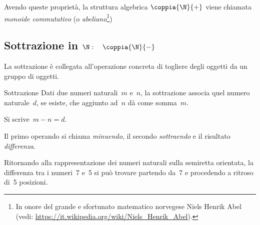 Avendo queste proprietà, la struttura algebrica \(\coppia{\N}{+}\) viene 
chiamata \emph{monoide commutativo} (o \emph{abeliano}\footnote{
In onore del grande e sfortunato matematico norvegese Niels Henrik Abel\\ 
(vedi: \url{https://it.wikipedia.org/wiki/Niels_Henrik_Abel}).})


\subsection{Sottrazione in $\N: \quad \coppia{\N}{-}$}

La sottrazione è collegata all'operazione concreta di togliere degli oggetti 
da un gruppo di oggetti.

\begin{definizione}{Sottrazione}{}
Dati due numeri naturali~\(m\) e~\(n\), la sottrazione associa quel 
numero naturale~\(d\), se esiste, che aggiunto ad~\(n\) dà come somma~\(m\).

Si scrive~\(m - n = d\).

Il primo operando si chiama \emph{minuendo}, il secondo \emph{sottraendo} e 
il risultato \emph{differenza}.
\end{definizione}

% 
Ritornando alla rappresentazione dei numeri naturali sulla semiretta 
orientata, la differenza tra i numeri~7 e~5 si può trovare partendo da~7 e 
procedendo a ritroso di~5 posizioni.


